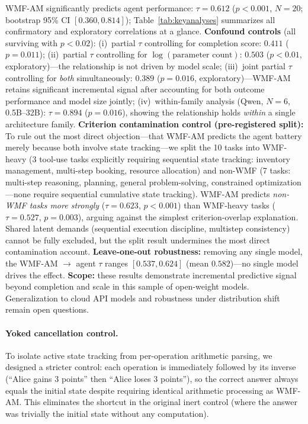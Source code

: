 \documentclass{article}
\begin{document}
WMF-AM significantly predicts agent performance: $\tau = 0.612$
($p < 0.001$, $N{=}20$; bootstrap 95\% CI $[0.360, 0.814]$);
Table~\ref{tab:keyanalyses} summarizes all confirmatory and exploratory
correlations at a glance.
\textbf{Confound controls} (all surviving with $p < 0.02$):
(i)~partial $\tau$ controlling for completion score: $0.411$ ($p = 0.011$);
(ii)~partial $\tau$ controlling for $\log(\text{parameter count})$:
$0.503$ ($p < 0.01$, exploratory)---the relationship is not driven by model scale;
(iii)~joint partial $\tau$ controlling for \emph{both} simultaneously:
$0.389$ ($p = 0.016$, exploratory)---WMF-AM retains significant
incremental signal after accounting for both outcome performance and
model size jointly;
(iv)~within-family analysis (Qwen, $N{=}6$, 0.5B--32B):
$\tau = 0.894$ ($p = 0.016$), showing the relationship holds
\emph{within} a single architecture family.
\textbf{Criterion contamination control (pre-registered split):}
To rule out the most direct objection---that WMF-AM predicts the agent
battery merely because both involve state tracking---we split the 10
tasks into WMF-heavy (3 tool-use tasks explicitly requiring sequential
state tracking: inventory management, multi-step booking, resource allocation)
and non-WMF (7 tasks: multi-step reasoning, planning,
general problem-solving, constrained optimization---none require sequential
cumulative state tracking).
WMF-AM predicts \emph{non-WMF tasks more strongly}
($\tau = 0.623$, $p < 0.001$) than WMF-heavy tasks
($\tau = 0.527$, $p = 0.003$), arguing against the simplest
criterion-overlap explanation. Shared latent demands (sequential
execution discipline, multistep consistency) cannot be fully excluded,
but the split result undermines the most direct contamination account.
\textbf{Leave-one-out robustness:} removing any single model, the
WMF-AM $\to$ agent $\tau$ ranges $[0.537, 0.624]$ (mean $0.582$)---no
single model drives the effect.
\textbf{Scope:} these results demonstrate incremental predictive signal
beyond completion and scale in this sample of open-weight models.
Generalization to cloud API models and robustness under distribution
shift remain open questions.

\paragraph{Yoked cancellation control.}
To isolate active state tracking from per-operation arithmetic parsing,
we designed a stricter control: each operation is immediately followed
by its inverse (``Alice gains 3 points'' then ``Alice loses 3 points''),
so the correct answer always equals the initial state despite requiring
identical arithmetic processing as WMF-AM. This eliminates the shortcut
in the original inert control (where the answer was trivially the
initial state without any computation).
\end{document}

